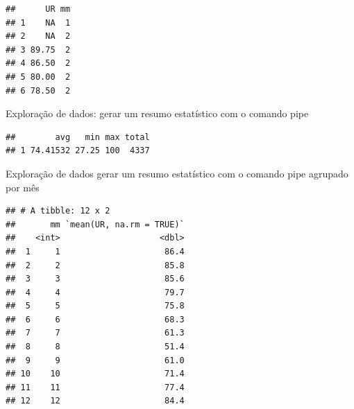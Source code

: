 \documentclass[
]{book}
\newenvironment{Shaded}{\begin{snugshade}}{\end{snugshade}}
\newcommand{\DataTypeTok}[1]{\textcolor[rgb]{0.13,0.29,0.53}{#1}}
\newcommand{\KeywordTok}[1]{\textcolor[rgb]{0.13,0.29,0.53}{\textbf{#1}}}
\newcommand{\NormalTok}[1]{#1}
\newcommand{\OperatorTok}[1]{\textcolor[rgb]{0.81,0.36,0.00}{\textbf{#1}}}
\newcommand{\OtherTok}[1]{\textcolor[rgb]{0.56,0.35,0.01}{#1}}
\newcommand{\StringTok}[1]{\textcolor[rgb]{0.31,0.60,0.02}{#1}}
\begin{document}
\begin{verbatim}
##      UR mm
## 1    NA  1
## 2    NA  2
## 3 89.75  2
## 4 86.50  2
## 5 80.00  2
## 6 78.50  2
\end{verbatim}

Exploração de dados: gerar um resumo estatístico com o comando pipe

\begin{Shaded}
\end{Shaded}

\begin{verbatim}
##        avg   min max total
## 1 74.41532 27.25 100  4337
\end{verbatim}

Exploração de dados gerar um resumo estatístico com o comando pipe agrupado por mês

\begin{Shaded}
\end{Shaded}

\begin{verbatim}
## # A tibble: 12 x 2
##       mm `mean(UR, na.rm = TRUE)`
##    <int>                    <dbl>
##  1     1                     86.4
##  2     2                     85.8
##  3     3                     85.6
##  4     4                     79.7
##  5     5                     75.8
##  6     6                     68.3
##  7     7                     61.3
##  8     8                     51.4
##  9     9                     61.0
## 10    10                     71.4
## 11    11                     77.4
## 12    12                     84.4
\end{verbatim}
\end{document}
